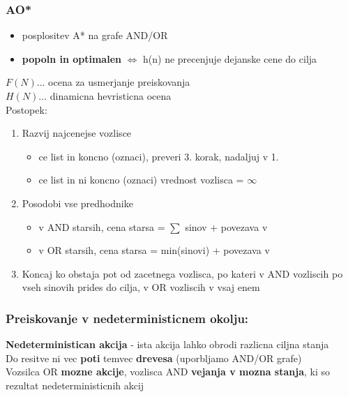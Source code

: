 \subsubsection{AO*}
\begin{itemize}[noitemsep,topsep=0pt,leftmargin=*]
    \item posplositev A* na grafe AND/OR
    \item \textbf{popoln in optimalen} $\Leftrightarrow$ h(n) ne precenjuje dejanske cene do cilja
\end{itemize}
$F(N) \dots$ ocena za usmerjanje preiskovanja\\ 
$H(N) \dots$ dinamicna hevristicna ocena\\
Postopek:
\begin{enumerate}[noitemsep,topsep=0pt,leftmargin=*]
    \item Razvij najcenejse vozlisce
    \begin{itemize}[noitemsep,topsep=0pt,leftmargin=*]
        \item ce list in koncno (oznaci), preveri 3. korak, nadaljuj v 1.
        \item ce list in ni koncno (oznaci) vrednost vozlisca = $\infty$
    \end{itemize}
    \item Posodobi vse predhodnike
    \begin{itemize}[noitemsep,topsep=0pt,leftmargin=*]
        \item v AND starsih, cena starsa = $\sum$ sinov + povezava v
        \item v OR starsih, cena starsa = min(sinovi) + povezava v
    \end{itemize}
    \item Koncaj ko obstaja pot od zacetnega vozlisca, po kateri v AND vozliscih po vseh sinovih prides do cilja, v OR vozliscih v vsaj enem
\end{enumerate}

\subsubsection{Preiskovanje v nedeterministicnem okolju:}
\textbf{Nedeterministican akcija} - ista akcija lahko obrodi razlicna ciljna stanja\\
Do resitve ni vec \textbf{poti} temvec \textbf{drevesa} (uporbljamo AND/OR grafe)\\
Vozsilca OR \textbf{mozne akcije}, vozlisca AND \textbf{vejanja v mozna stanja}, ki so rezultat nedeterministicnih akcij

